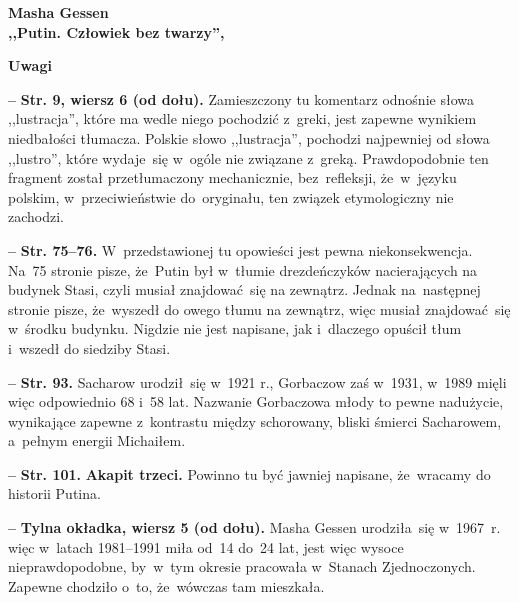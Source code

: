\documentclass[a4paper,11pt]{article}  %
\newcommand{\spaceTwo}{2em}
\newcommand{\spaceFour}{0.5em}
\newcommand{\tb}{\textbf}
\newcommand{\noi}{\noindent}
\newcommand{\start}{\noi \tb{--} {}}
\newcommand{\Str}[1]{\tb{Str. #1.}}
\newcommand{\StrWd}[2]{\tb{Str. #1, wiersz #2 (od dołu).}}
\newcommand{\Center}[1]{\begin{center} #1 \end{center}}
\newcommand{\CenterTB}[1]{\Center{\tb{#1}}}
\newcommand{\Work}[1]{ \begin{center} {\large \tb{#1}} \end{center} }
\begin{document}
\vspace{\spaceTwo}





\Work{
  Masha Gessen \\
  ,,Putin. Człowiek bez twarzy'',
  \cite{GessenPutinCzlowiekBezTwarzy12} }


\CenterTB{Uwagi}

\start \StrWd{9}{6} Zamieszczony tu komentarz odnośnie słowa
,,lustracja'', które ma wedle niego pochodzić z~greki, jest zapewne
wynikiem niedbałości tłumacza. Polskie słowo ,,lustracja'', pochodzi
najpewniej od słowa ,,lustro'', które wydaje~się w~ogóle nie związane
z~greką. Prawdopodobnie ten fragment został przetłumaczony
mechanicznie, bez~refleksji, że~w~języku polskim, w~przeciwieństwie
do~oryginału, ten związek etymologiczny nie zachodzi.

\vspace{\spaceFour}


\start \Str{75--76} W~przedstawionej tu opowieści jest pewna
niekonsekwencja. Na~75 stronie pisze, że~Putin był w~tłumie
drezdeńczyków nacierających na budynek Stasi, czyli musiał
znajdować~się na zewnątrz. Jednak na~następnej stronie pisze,
że~wyszedł do owego tłumu na zewnątrz, więc musiał znajdować~się
w~środku budynku. Nigdzie nie jest napisane, jak i~dlaczego opuścił
tłum i~wszedł do siedziby Stasi.

\vspace{\spaceFour}


\start \Str{93} Sacharow urodził~się w~1921 r., Gorbaczow zaś w~1931,
w~1989 mięli więc odpowiednio 68 i~58 lat. Nazwanie Gorbaczowa młody
to pewne nadużycie, wynikające zapewne z~kontrastu między schorowany,
bliski śmierci Sacharowem, a~pełnym energii Michaiłem.

\vspace{\spaceFour}


\start \Str{101} \tb{Akapit trzeci.} Powinno tu być jawniej napisane,
że~wracamy do historii Putina.

\vspace{\spaceFour}


\start \tb{Tylna okładka, wiersz 5 (od dołu).} Masha Gessen
urodziła~się w~1967~r. więc w~latach 1981--1991 miła od~14 do~24 lat,
jest więc wysoce nieprawdopodobne, by~w~tym okresie pracowała
w~Stanach Zjednoczonych. Zapewne chodziło o~to, że~wówczas tam
mieszkała.
\end{document}
